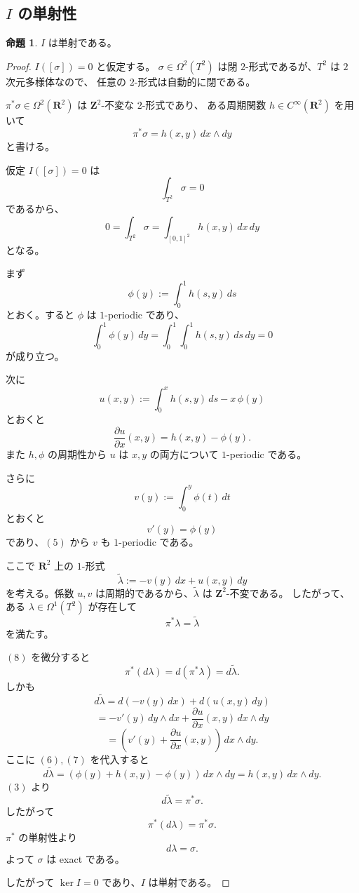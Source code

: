 \documentclass[uplatex,dvipdfmx,11pt]{jsarticle}
\newcommand{\R}{\mathbf{R}}
\newcommand{\Z}{\mathbf{Z}}
\theoremstyle{definition}
\newtheorem{prop}{命題}
\begin{document}
\subsection{\(I\) の単射性}

\begin{prop}
\(I\) は単射である。
\end{prop}

\begin{proof}
\(I([\sigma])=0\) と仮定する。
\(\sigma\in \Omega^2(T^2)\) は閉 $2$-形式であるが、\(T^2\) は $2$ 次元多様体なので、
任意の $2$-形式は自動的に閉である。

\(\pi^*\sigma\in \Omega^2(\R^2)\) は \(\Z^2\)-不変な $2$-形式であり、
ある周期関数 \(h\in C^\infty(\R^2)\) を用いて
\[
\pi^*\sigma=h(x,y)\,dx\wedge dy
\tag{3}
\]
と書ける。

仮定 \(I([\sigma])=0\) は
\[
\int_{T^2}\sigma=0
\]
であるから、
\[
0=\int_{T^2}\sigma=\int_{[0,1]^2} h(x,y)\,dx\,dy
\tag{4}
\]
となる。

まず
\[
\phi(y):=\int_0^1 h(s,y)\,ds
\]
とおく。すると \(\phi\) は \(1\)-periodic であり、
\[
\int_0^1 \phi(y)\,dy
=
\int_0^1\int_0^1 h(s,y)\,ds\,dy
=0
\tag{5}
\]
が成り立つ。

次に
\[
u(x,y):=\int_0^x h(s,y)\,ds - x\,\phi(y)
\]
とおくと
\[
\frac{\partial u}{\partial x}(x,y)=h(x,y)-\phi(y).
\tag{6}
\]
また \(h,\phi\) の周期性から \(u\) は \(x,y\) の両方について \(1\)-periodic である。

さらに
\[
v(y):=\int_0^y \phi(t)\,dt
\]
とおくと
\[
v'(y)=\phi(y)
\tag{7}
\]
であり、\((5)\) から \(v\) も \(1\)-periodic である。

ここで \(\R^2\) 上の $1$-形式
\[
\widetilde{\lambda}:=-v(y)\,dx+u(x,y)\,dy
\]
を考える。係数 \(u,v\) は周期的であるから、\(\widetilde{\lambda}\) は \(\Z^2\)-不変である。
したがって、ある \(\lambda\in \Omega^1(T^2)\) が存在して
\[
\pi^*\lambda=\widetilde{\lambda}
\tag{8}
\]
を満たす。

\((8)\) を微分すると
\[
\pi^*(d\lambda)=d(\pi^*\lambda)=d\widetilde{\lambda}.
\]
しかも
\[
d\widetilde{\lambda}
=
d(-v(y)\,dx)+d(u(x,y)\,dy)
\]
\[
=
-v'(y)\,dy\wedge dx+\frac{\partial u}{\partial x}(x,y)\,dx\wedge dy
\]
\[
=
\left(v'(y)+\frac{\partial u}{\partial x}(x,y)\right)\,dx\wedge dy.
\]
ここに \((6),(7)\) を代入すると
\[
d\widetilde{\lambda}
=
\left(\phi(y)+h(x,y)-\phi(y)\right)\,dx\wedge dy
=
h(x,y)\,dx\wedge dy.
\]
\((3)\) より
\[
d\widetilde{\lambda}=\pi^*\sigma.
\]
したがって
\[
\pi^*(d\lambda)=\pi^*\sigma.
\]
\(\pi^*\) の単射性より
\[
d\lambda=\sigma.
\]
よって \(\sigma\) は exact である。

したがって \(\ker I=0\) であり、\(I\) は単射である。
\end{proof}
\end{document}
